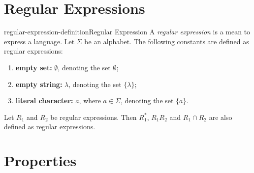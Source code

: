\documentclass[preview]{standalone}
\newcommand{\emptyString}{\lambda}
\begin{document}
\genpage

\section{Regular Expressions}

\begin{snippetdefinition}{regular-expression-definition}{Regular Expression}
    A \textit{regular expression} is a mean to express a language.
    Let \(\Sigma\) be an alphabet.
    The following constants are defined as regular expressions:
    \begin{enumerate}
        \item \textbf{empty set:} \(\emptyset\), denoting the set \(\emptyset\);
        \item \textbf{empty string:} \(\emptyString\), denoting the set \(\{\emptyString\}\);
        \item \textbf{literal character:} \(a\), where \(a \in \Sigma\), denoting the set \(\{a\}\).
    \end{enumerate}
    Let \(R_1\) and \(R_2\) be regular expressions.
    Then \(R_1^*\), \(R_1 R_2\) and \(R_1 \cap R_2\) are also defined as regular expressions.
\end{snippetdefinition}


\section{Properties}
\end{document}
